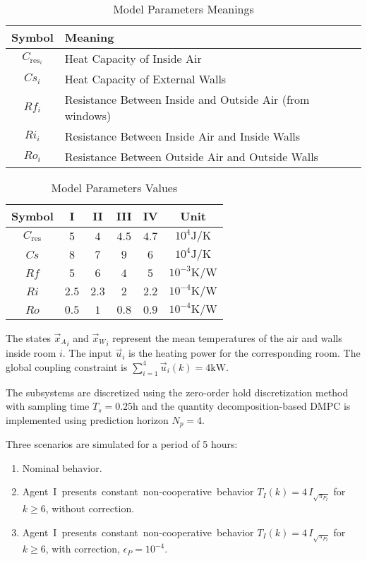 \documentclass[a4paper, 10 pt, conference]{ieeeconf}  %
\begin{document}
\begin{table}[b]
  \centering
  \caption{Model Parameters Meanings}\label{tab:modelParamMeaning}
  \begin{tabular}[b]{cl}
    \toprule
    Symbol&Meaning\\
    \midrule
    $C_{\mathrm{res}_{i}}$&Heat Capacity of Inside Air\\
    $Cs_{i}$&Heat Capacity of External Walls\\
    $Rf_{i}$&Resistance Between Inside and Outside Air (from windows)\\
    $Ri_{i}$&Resistance Between Inside Air and Inside Walls\\
    $Ro_{i}$&Resistance Between Outside Air and Outside Walls\\
    \bottomrule
  \end{tabular}
\end{table}
\begin{table}[b]
  \centering
  \caption{Model Parameters Values}\label{tab:modelParam}
  \begin{tabular}[t]{cccccc} \toprule
    Symbol& I & II & III & IV &Unit\\
    \midrule
    $C_{\mathrm{res}}$    &$5$   & $4$ & $4.5$ &$4.7$ &$10^{4}\mathrm{J/K}$ \\
    $Cs$               &$8$   & $7$ &$9$&$6$  &$10^{4}\mathrm{J/K}$  \\
    $Rf$               &$5$   & $6$& $4$& $5$  &$10^{-3}\mathrm{K/W}$ \\
    $Ri$               &$2.5$ & $2.3$&$2$&$2.2$ &$10^{-4}\mathrm{K/W}$\\
    $Ro$               &$0.5$ & $1$ &$0.8$&$0.9$  & $10^{-4}\mathrm{K/W}$ \\
    \bottomrule
  \end{tabular}
\end{table}
The states ${\vec{x}_{A}}_{i}$ and ${\vec{x}_{W}}_{i}$ represent the mean temperatures of the air and walls inside room $i$. The input $\vec{u}_{i}$ is the heating power
for the corresponding room.
The global coupling constraint is ${\sum_{i=1}^{4}\vec{u}_{i}(k)=4\mathrm{kW}}$.

The subsystems are discretized using the zero-order hold discretization method with sampling time
${T_{s}=0.25\mathrm{h}}$
and the quantity decomposition-based DMPC is implemented using prediction horizon ${N_{p}=4}$.

Three scenarios are simulated for a period of 5 hours:

  \begin{enumerate}
    \item Nominal behavior.
    \item \mbox{Agent I presents constant non-cooperative behavior} ${T_{I}(k)=4\,I_{\sqrt{\pi_{P_{I}}}}}$ for ${k\geq6}$, without correction.
    \item \mbox{Agent I presents constant non-cooperative behavior} ${T_{I}(k)=4\,I_{\sqrt{\pi_{P_{I}}}}}$ for ${k\geq6}$, with correction, ${\epsilon_{P}=10^{-4}}$.
  \end{enumerate}
\end{document}

